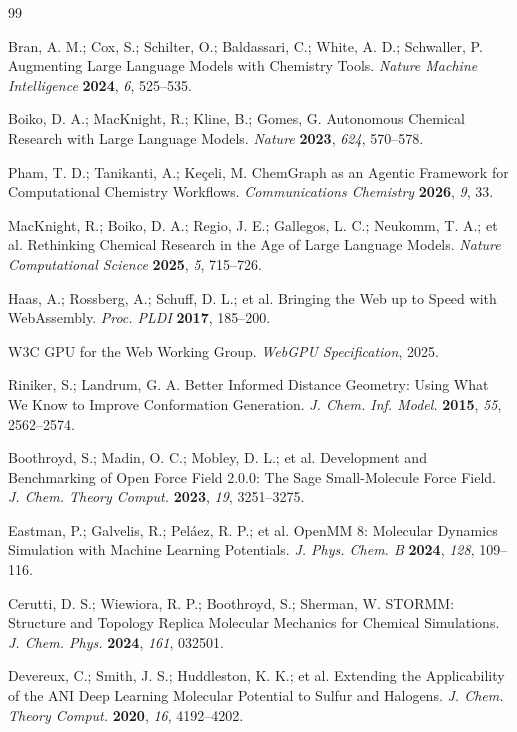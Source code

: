 \documentclass[11pt]{article}
\begin{document}
\begin{thebibliography}{99}

Bran, A. M.; Cox, S.; Schilter, O.; Baldassari, C.; White, A. D.; Schwaller, P.
Augmenting Large Language Models with Chemistry Tools.
\emph{Nature Machine Intelligence} \textbf{2024}, \emph{6}, 525--535.

Boiko, D. A.; MacKnight, R.; Kline, B.; Gomes, G.
Autonomous Chemical Research with Large Language Models.
\emph{Nature} \textbf{2023}, \emph{624}, 570--578.

Pham, T. D.; Tanikanti, A.; Ke{\c{c}}eli, M.
ChemGraph as an Agentic Framework for Computational Chemistry Workflows.
\emph{Communications Chemistry} \textbf{2026}, \emph{9}, 33.

MacKnight, R.; Boiko, D. A.; Regio, J. E.; Gallegos, L. C.; Neukomm, T. A.; et al.
Rethinking Chemical Research in the Age of Large Language Models.
\emph{Nature Computational Science} \textbf{2025}, \emph{5}, 715--726.

Haas, A.; Rossberg, A.; Schuff, D. L.; et al.
Bringing the Web up to Speed with WebAssembly.
\emph{Proc. PLDI} \textbf{2017}, 185--200.

W3C GPU for the Web Working Group.
\emph{WebGPU Specification}, 2025.

Riniker, S.; Landrum, G. A.
Better Informed Distance Geometry: Using What We Know to Improve Conformation Generation.
\emph{J. Chem. Inf. Model.} \textbf{2015}, \emph{55}, 2562--2574.

Boothroyd, S.; Madin, O. C.; Mobley, D. L.; et al.
Development and Benchmarking of Open Force Field 2.0.0: The Sage Small-Molecule Force Field.
\emph{J. Chem. Theory Comput.} \textbf{2023}, \emph{19}, 3251--3275.

Eastman, P.; Galvelis, R.; Pel{\'a}ez, R. P.; et al.
OpenMM 8: Molecular Dynamics Simulation with Machine Learning Potentials.
\emph{J. Phys. Chem. B} \textbf{2024}, \emph{128}, 109--116.

Cerutti, D. S.; Wiewiora, R. P.; Boothroyd, S.; Sherman, W.
STORMM: Structure and Topology Replica Molecular Mechanics for Chemical Simulations.
\emph{J. Chem. Phys.} \textbf{2024}, \emph{161}, 032501.

Devereux, C.; Smith, J. S.; Huddleston, K. K.; et al.
Extending the Applicability of the ANI Deep Learning Molecular Potential to Sulfur and Halogens.
\emph{J. Chem. Theory Comput.} \textbf{2020}, \emph{16}, 4192--4202.


\end{thebibliography}
\end{document}
